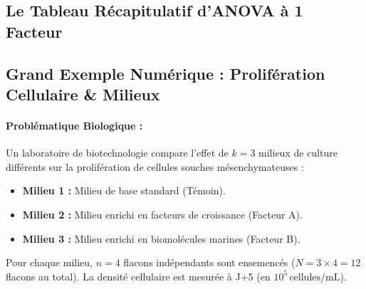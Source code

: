 \documentclass[11pt,a4paper]{article}
\begin{document}
\subsection{Le Tableau Récapitulatif d'ANOVA à 1 Facteur}
\begin{center}
\end{center}

\subsection{Grand Exemple Numérique : Prolifération Cellulaire \& Milieux}

\paragraph{Problématique Biologique :}
Un laboratoire de biotechnologie compare l'effet de $k = 3$ milieux de culture différents sur la prolifération de cellules souches mésenchymateuses :
\begin{itemize}[leftmargin=*, label=\faCheck]
  \item \textbf{Milieu 1 :} Milieu de base standard (Témoin).
  \item \textbf{Milieu 2 :} Milieu enrichi en facteurs de croissance (Facteur A).
  \item \textbf{Milieu 3 :} Milieu enrichi en biomolécules marines (Facteur B).
\end{itemize}
Pour chaque milieu, $n = 4$ flacons indépendants sont ensemencés ($N = 3 \times 4 = 12$ flacons au total). La densité cellulaire est mesurée à J+5 (en $10^5\,\text{cellules/mL}$).
\end{document}
